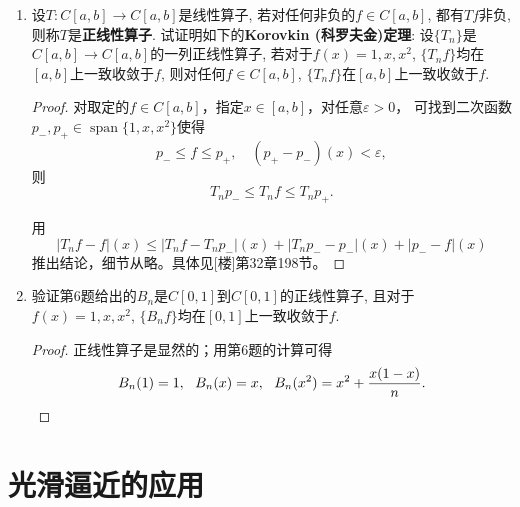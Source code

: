 \begin{quizb}
\begin{enumerate}
\item 设\(T: C[a,b]\rightarrow C[a,b]\)是线性算子, 
若对任何非负的\(f\in C[a,b]\), 都有\(Tf\)非负, 则称\(T\)是\textbf{正线性算子}. 
试证明如下的\textbf{Korovkin (科罗夫金)定理}: 
设\(\{T_n\}\)是\(C[a,b]\rightarrow C[a,b]\)的一列正线性算子, 
若对于\(f(x)=1,x,x^2\), \(\{T_nf\}\)均在\([a,b]\)上一致收敛于\(f\), 
则对任何\(f\in C[a,b]\), \(\{T_nf\}\)在\([a,b]\)上一致收敛于\(f\).
\begin{proof}
    对取定的$f\in C[a,b]$，指定$x\in[a,b]$，对任意$\varepsilon>0$，
    可找到二次函数$p_-,p_+\in\operatorname{span}\{1,x,x^2\}$使得
    \[p_- \leqslant f \leqslant p_+,\quad(p_+-p_-)(x)<\varepsilon,\]
    则\[T_np_- \leqslant T_nf \leqslant T_np_+.\]
    用\[|T_nf-f|(x)\leqslant|T_nf-T_np_-|(x)+|T_np_--p_-|(x)+|p_--f|(x)\]
    推出结论，细节从略。具体见[楼]第32章198节。
\end{proof}

\item 验证第6题给出的\(B_n\)是\(C[0,1]\)到\(C[0,1]\)的正线性算子, 
且对于\(f(x)=1,x,x^2\), \(\{B_nf\}\)均在\([0,1]\)上一致收敛于\(f\).
\begin{proof}
    正线性算子是显然的；用第6题的计算可得
    \[B_n(1)=1,\ \ B_n(x)=x,\ \ B_n(x^2)=x^2+\frac{x(1-x)}{n}.\qedhere\]
\end{proof}
\end{enumerate}
\end{quizb}

\section{光滑逼近的应用}

